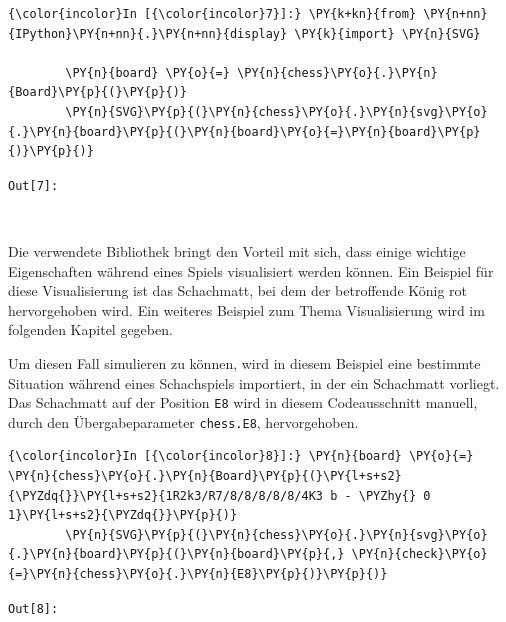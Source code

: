     \begin{Verbatim}[commandchars=\\\{\}]
{\color{incolor}In [{\color{incolor}7}]:} \PY{k+kn}{from} \PY{n+nn}{IPython}\PY{n+nn}{.}\PY{n+nn}{display} \PY{k}{import} \PY{n}{SVG}
        
        \PY{n}{board} \PY{o}{=} \PY{n}{chess}\PY{o}{.}\PY{n}{Board}\PY{p}{(}\PY{p}{)}
        \PY{n}{SVG}\PY{p}{(}\PY{n}{chess}\PY{o}{.}\PY{n}{svg}\PY{o}{.}\PY{n}{board}\PY{p}{(}\PY{n}{board}\PY{o}{=}\PY{n}{board}\PY{p}{)}\PY{p}{)} 
\end{Verbatim}

\texttt{\color{outcolor}Out[{\color{outcolor}7}]:}
    
    \begin{center}
    \end{center}
    { \hspace*{\fill} \\}
    

    Die verwendete Bibliothek bringt den Vorteil mit sich, dass einige
wichtige Eigenschaften während eines Spiels visualisiert werden können.
Ein Beispiel für diese Visualisierung ist das Schachmatt, bei dem der
betroffende König rot hervorgehoben wird. Ein weiteres Beispiel zum
Thema Visualisierung wird im folgenden Kapitel gegeben.

Um diesen Fall simulieren zu können, wird in diesem Beispiel eine
bestimmte Situation während eines Schachspiels importiert, in der ein
Schachmatt vorliegt. Das Schachmatt auf der Position \texttt{E8} wird in
diesem Codeausschnitt manuell, durch den Übergabeparameter
\texttt{chess.E8}, hervorgehoben.

    \begin{Verbatim}[commandchars=\\\{\}]
{\color{incolor}In [{\color{incolor}8}]:} \PY{n}{board} \PY{o}{=} \PY{n}{chess}\PY{o}{.}\PY{n}{Board}\PY{p}{(}\PY{l+s+s2}{\PYZdq{}}\PY{l+s+s2}{1R2k3/R7/8/8/8/8/8/4K3 b - \PYZhy{} 0 1}\PY{l+s+s2}{\PYZdq{}}\PY{p}{)}
        \PY{n}{SVG}\PY{p}{(}\PY{n}{chess}\PY{o}{.}\PY{n}{svg}\PY{o}{.}\PY{n}{board}\PY{p}{(}\PY{n}{board}\PY{p}{,} \PY{n}{check}\PY{o}{=}\PY{n}{chess}\PY{o}{.}\PY{n}{E8}\PY{p}{)}\PY{p}{)}
\end{Verbatim}

\texttt{\color{outcolor}Out[{\color{outcolor}8}]:}
    
    \begin{center}
    \end{center}
    { \hspace*{\fill} \\}
    

